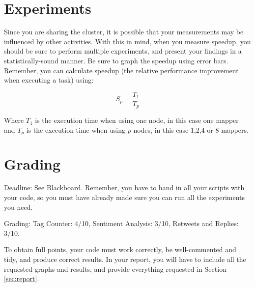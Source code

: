 \documentclass[a4paper,10pt]{article}
\begin{document}
  
  \section{Experiments}
  
  Since you are sharing the cluster, it is possible that your measurements may be influenced by other activities.  With this in mind, when you measure speedup, you should be sure to perform multiple experiments, and present your findings in a statistically-sound manner. Be sure to graph the speedup using error bars. Remember, you can calculate speedup (the relative performance improvement when executing a task) using:
  
  \[
  S_p = \frac{T_1}{T_p}
  \]
  
  Where $T_1$ is the execution time when using one node, in this case one mapper and $T_p$ is the execution time when using $p$ nodes, in this case 1,2,4 or 8 mappers.
  
  
  \section{Grading}
  Deadline: See Blackboard. Remember, you have to hand in all your scripts with your code, so you must have already made sure you can run all the experiments you need. 
  
  Grading: Tag Counter: 4/10, Sentiment Analysis: 3/10, Retweets and Replies: 3/10. 
  
  To obtain full points, your code must work correctly, be well-commented and tidy, and produce correct results.  In your report, you will have to include all the requested graphs and results, and provide everything requested in Section \ref{sec:report}.
  
\end{document}
